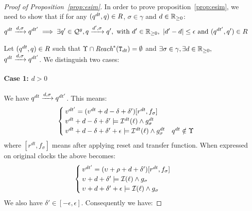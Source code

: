 \begin{proof}[Proof of Proposition~\ref{prop:esim}]
  
  In order to prove proposition~\ref{prop:esim}, we need to show that if for any 
  $(q^{dt},q)\in R$, $\sigma\in\gamma$ and $d\in\mathbb{R}_{\ge 0}$:
      \begin{displaymath}
        q^{dt}\xrightarrow{d,\sigma}q^{dt'} \implies \exists q'\in\mathcal{Q}^g, q\xrightarrow{d',\sigma}q',
        \text{ with } 
        d'\in\mathbb{R}_{\ge 0}, \ |d'-d|\le\epsilon \text{ and } (q^{dt'},q')\in R
      \end{displaymath}
       
      Let $(q^{dt},q)\in R$ such that $\Upsilon\cap\textit{Reach}^*(\texttt{T}_{dt})=\emptyset$ and 
      $\exists\sigma\in\gamma,\exists d\in\mathbb{R}_{\ge 0},$ 
  $q^{dt}\xrightarrow{d,\sigma}q^{dt'}$. We distinguish two cases:
  \paragraph{\textbf{Case 1: $d > 0$}\\}
  We have $q^{dt} \xrightarrow{d,\sigma}q^{dt'}$. This means:
    \[
    \begin{cases}{}
      v^{dt'}=(v^{dt}+d-\delta+\delta')[r^{dt},f_{\sigma}] \\  
      v^{dt} +d-\delta+\delta'\models\mathcal{I}^{dt}(\ell)\wedge g_{\sigma}^{dt} \\ 
      v^{dt} +d-\delta+\delta'+\epsilon\models\mathcal{I}^{dt}(\ell)\wedge g_{\sigma}^{dt}& 
      q^{dt}\notin\Upsilon 
    \end{cases}\]
  where $[r^{dt},f_{\sigma}]$ means after applying reset and transfer function.
  When expressed on original clocks the above becomes:
    \[\begin{cases}{}
      v^{dt'}=(\upsilon+\rho+d+\delta')[r^{dt},f_{\sigma}]\\ 
      \upsilon+d+\delta'\models\mathcal{I}(\ell)\wedge g_{\sigma} \\ 
      \upsilon+d+\delta'+\epsilon\models\mathcal{I}(\ell)\wedge g_{\sigma} 
    \end{cases}\]
  We also have $\delta'\in[-\epsilon,\epsilon]$. Consequently we have: 
  

\end{proof}
